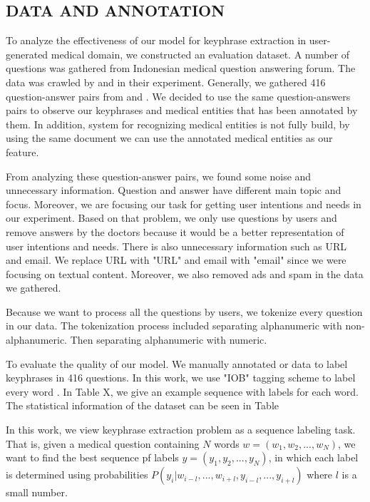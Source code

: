\subsection{DATA AND ANNOTATION}
To analyze the effectiveness of our model for keyphrase extraction in user-generated medical domain, we constructed an evaluation dataset. A number of questions was gathered from Indonesian medical question answering forum. The data was crawled by \cite{skripsiKakRadit} and \cite{skripsiWahid} in their experiment. Generally, we gathered 416 question-answer pairs from \cite{skripsiKakRadit} and \cite{skripsiWahid}. We decided to use the same question-answers pairs to observe our keyphrases and medical entities that has been annotated by them. In addition, system for recognizing medical entities is not fully build, by using the same document we can use the annotated medical entities as our feature.

From analyzing these question-answer pairs, we found some noise and unnecessary information. Question and answer have different main topic and focus. Moreover, we are focusing our task for getting user intentions and needs in our experiment. Based on that problem, we only use questions by users and remove answers by the doctors because it would be a better representation of user intentions and needs. There is also unnecessary information such as URL and email. We replace URL with "URL"  and email with "email" since we were focusing on textual content. Moreover, we also removed ads and spam in the data we gathered.

Because we want to process all the questions by users, we tokenize every question in our data. The tokenization process included separating alphanumeric with non-alphanumeric. Then separating alphanumeric with numeric. 

To evaluate the quality of our model. We manually annotated or data to label keyphrases in 416 questions. In this work, we use "IOB" tagging scheme to label every word \cite{collobert2011natural}. In Table X, we give an example sequence with labels for each word. The statistical information of the dataset can be seen in Table 
\fi

In this work, we view keyphrase extraction problem as a sequence labeling task. That is, given a medical question containing $N$ words $w = (w_1, w_2,...,w_N)$, we want to find the best sequence pf labels $y = (y_1, y_2,..., y_N)$, in which each label is determined using probabilities $P(y_i|w_{i-l},...,w_{i+l},y_{i-l},...,y_{i+l})$ where $l$ is a small number.

